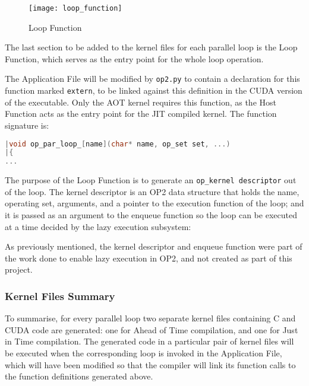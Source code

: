 \begin{wrapfigure}{r}{.33\textwidth}
  \centering
  \caption{Loop Function}
  \label{fig:loop_func}
  \texttt{[image: loop\_function]}
\end{wrapfigure}
The last section to be added to the kernel files for each parallel loop is the Loop Function, which serves as the entry point for the whole loop operation.
 \par
The Application File will be modified by \verb|op2.py| to contain a declaration for this function marked \verb|extern|, to be linked against this definition in the CUDA version of the executable. Only the AOT kernel requires this function, as the Host Function acts as the entry point for the JIT compiled kernel. The function signature is:
\begin{lstlisting}[backgroundcolor=\color{blue!20}, language=C]
|void op_par_loop_[name](char* name, op_set set, ...)
|{
...
\end{lstlisting}
\par
\noindent The purpose of the Loop Function is to generate an \verb|op_kernel descriptor| out of the loop. The kernel descriptor is an OP2 data structure that holds the name, operating set, arguments, and a pointer to the execution function of the loop; and it is passed as an argument to the enqueue function so the loop can be executed at a time decided by the lazy execution subsystem:

\noindent As previously mentioned, the kernel descriptor and enqueue function were part of the work done to enable lazy execution in OP2, and not created as part of this project.

\clearpage

\subsubsection{Kernel Files Summary}
\label{impl_summary}

To summarise, for every parallel loop two separate kernel files containing C and CUDA code are generated: one for Ahead of Time compilation, and one for Just in Time compilation. The generated code in a particular pair of kernel files will be executed when the corresponding loop is invoked in the Application File, which will have been modified so that the compiler will link its function calls to the function definitions generated above.

